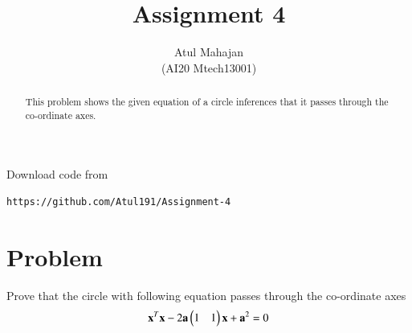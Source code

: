 \documentclass[journal,12pt,twocolumn]{IEEEtran}
\begin{document}
\makeatletter
{}
\makeatother
\let\StandardTheFigure\thefigure
\let\vec\mathbf
\renewcommand{\thefigure}{\theproblem}
\renewcommand{\thefigure}{\theproblem}
\def\putbox#1#2#3{\makebox[0in][l]{\makebox[#1][l]{}\raisebox{\baselineskip}[0in][0in]{\raisebox{#2}[0in][0in]{#3}}}}
     \def\rightbox#1{\makebox[0in][r]{#1}}
     \def\centbox#1{\makebox[0in]{#1}}
     \def\topbox#1{\raisebox{-\baselineskip}[0in][0in]{#1}}
     \def\midbox#1{\raisebox{-0.5\baselineskip}[0in][0in]{#1}}
\vspace{3cm}
\title{Assignment 4}
\author{Atul Mahajan\\ (AI20 Mtech13001)}
\maketitle
\newpage
\bigskip
\renewcommand{\thefigure}{\theenumi}
\renewcommand{\thetable}{\theenumi}
\begin{abstract}
This problem shows the given equation of a circle inferences that it passes through the co-ordinate axes.
\end{abstract}
Download  code from 
%
\begin{lstlisting}
https://github.com/Atul191/Assignment-4
\end{lstlisting}
%
\section{Problem}
Prove that the circle with following equation passes through the co-ordinate axes 
\begin{align}
\vec{x}^T\vec{x}-2\vec{a}\myvec{1 & 1}\vec{x}+\vec{a}^2 = 0 \label{eq1}
\end{align}
\end{document}
